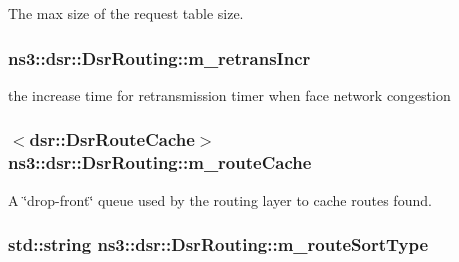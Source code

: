 The max size of the request table size. 

\subsubsection[{\texorpdfstring{m\+\_\+retrans\+Incr}{m_retransIncr}}]{ ns3\+::dsr\+::\+Dsr\+Routing\+::m\+\_\+retrans\+Incr\hspace{0.3cm}{\ttfamily [private]}}\hypertarget{classns3_1_1dsr_1_1DsrRouting_a49d8f2c59b9e8bcd6cb57cb302eac47b}{}\label{classns3_1_1dsr_1_1DsrRouting_a49d8f2c59b9e8bcd6cb57cb302eac47b}


the increase time for retransmission timer when face network congestion 

\subsubsection[{\texorpdfstring{m\+\_\+route\+Cache}{m_routeCache}}]{$<${\bf dsr\+::\+Dsr\+Route\+Cache}$>$ ns3\+::dsr\+::\+Dsr\+Routing\+::m\+\_\+route\+Cache\hspace{0.3cm}{\ttfamily [private]}}\hypertarget{classns3_1_1dsr_1_1DsrRouting_ac409bdb961b9fff0fb63ebd026be99ad}{}\label{classns3_1_1dsr_1_1DsrRouting_ac409bdb961b9fff0fb63ebd026be99ad}


A \char`\"{}drop-\/front\char`\"{} queue used by the routing layer to cache routes found. 

\subsubsection[{\texorpdfstring{m\+\_\+route\+Sort\+Type}{m_routeSortType}}]{\setlength{\rightskip}{0pt plus 5cm}std\+::string ns3\+::dsr\+::\+Dsr\+Routing\+::m\+\_\+route\+Sort\+Type\hspace{0.3cm}{\ttfamily [private]}}\hypertarget{classns3_1_1dsr_1_1DsrRouting_a02b1f61021bb9db1a72bcff2eb4b496d}{}\label{classns3_1_1dsr_1_1DsrRouting_a02b1f61021bb9db1a72bcff2eb4b496d}


